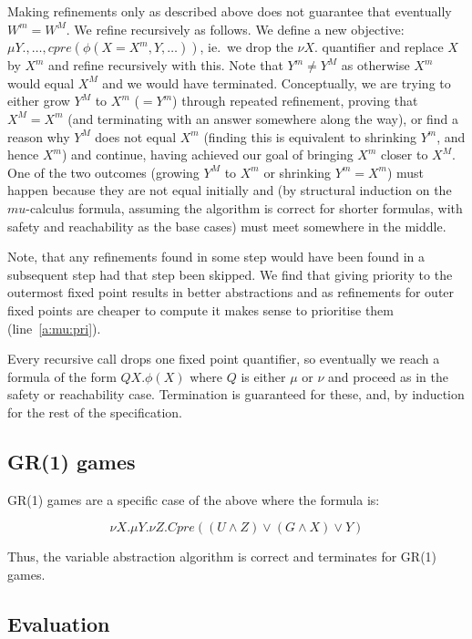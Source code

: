 Making refinements only as described above does not guarantee that eventually $W^m = W^M$. We refine recursively as follows. We define a new objective: $\mu Y., \ldots, cpre(\phi(X=X^m, Y, \ldots))$, ie.\ we drop the $\nu X.$ quantifier and replace $X$ by $X^m$ and refine recursively with this. Note that $Y^m \neq Y^M$ as otherwise $X^m$ would equal $X^M$ and we would have terminated. Conceptually, we are trying to either grow $Y^M$ to $X^m$ ($=Y^m$) through repeated refinement, proving that $X^M = X^m$ (and terminating with an answer somewhere along the way), or find a reason why $Y^M$ does not equal $X^m$ (finding this is equivalent to shrinking $Y^m$, and hence $X^m$) and continue, having achieved our goal of bringing $X^m$ closer to $X^M$. One of the two outcomes (growing $Y^M$ to $X^m$ or shrinking $Y^m = X^m$) must happen because they are not equal initially and (by structural induction on the $mu$-calculus formula, assuming the algorithm is correct for shorter formulas, with safety and reachability as the base cases) must meet somewhere in the middle.

Note, that any refinements found in some step would have been found in a subsequent step had that step been skipped. We find that giving priority to the outermost fixed point results in better abstractions and as refinements for outer fixed points are cheaper to compute it makes sense to prioritise them (line~\ref{a:mu:pri}).

Every recursive call drops one fixed point quantifier, so eventually we reach a formula of the form $Q X. \phi(X)$ where $Q$ is either $\mu$ or $\nu$ and proceed as in the safety or reachability case. Termination is guaranteed for these, and, by induction for the rest of the specification.

\subsection{GR(1) games}

GR(1) games are a specific case of the above where the formula is:

\begin{equation}
    \nu X. \mu Y. \nu Z. Cpre((U \wedge Z) \vee (G \wedge X) \vee Y)
\end{equation}

Thus, the variable abstraction algorithm is correct and terminates for GR(1) games.

\subsection{Evaluation}
\label{sec:threevaleval}


